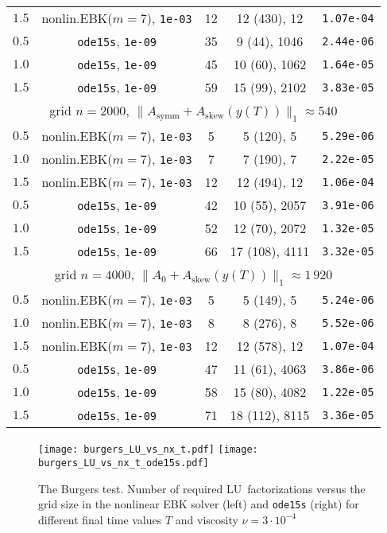 \documentclass[sn-aps]{sn-jnl}
\theoremstyle{thmstyleone}%
\theoremstyle{thmstyletwo}%
\theoremstyle{thmstylethree}%
\newcommand{\Asymm}{A_{\mathrm{symm}}}
\newcommand{\Askew}{A_{\mathrm{skew}}}
\begin{document}
\begin{table}
\begin{tabular}{ccccc}
$1.5$  & nonlin.EBK($m=7$), {\tt 1e-03} & 12    & 12 (430), 12       & {\tt 1.07e-04} \\
$0.5$  & {\tt ode15s},  {\tt 1e-09}     & 35    & 9  (44), 1046      & {\tt 2.44e-06} \\
$1.0$  & {\tt ode15s},  {\tt 1e-09}     & 45    & 10 (60), 1062      & {\tt 1.64e-05} \\
$1.5$  & {\tt ode15s},  {\tt 1e-09}     & 59    & 15 (99), 2102      & {\tt 3.83e-05} \\
\hline
\multicolumn{5}{c}{grid $n=2000$, $\|\Asymm + \Askew (y(T))\|_1\approx 540$}\\
$0.5$  & nonlin.EBK($m=7$), {\tt 1e-03} & 5     & 5 (120), 5         & {\tt 5.29e-06} \\
$1.0$  & nonlin.EBK($m=7$), {\tt 1e-03} & 7     & 7 (190), 7         & {\tt 2.22e-05} \\
$1.5$  & nonlin.EBK($m=7$), {\tt 1e-03} & 12    & 12 (494), 12       & {\tt 1.06e-04} \\
$0.5$  & {\tt ode15s},  {\tt 1e-09}     & 42    & 10 (55), 2057      & {\tt 3.91e-06} \\
$1.0$  & {\tt ode15s},  {\tt 1e-09}     & 52    & 12 (70), 2072      & {\tt 1.32e-05} \\
$1.5$  & {\tt ode15s},  {\tt 1e-09}     & 66    & 17 (108), 4111     & {\tt 3.32e-05} \\
\hline
\multicolumn{5}{c}{grid $n=4000$, $\|A_0 + \Askew (y(T))\|_1\approx 1\,920$}\\
$0.5$  & nonlin.EBK($m=7$), {\tt 1e-03} & 5    & 5 (149), 5         & {\tt 5.24e-06} \\
$1.0$  & nonlin.EBK($m=7$), {\tt 1e-03} & 8    & 8 (276), 8         & {\tt 5.52e-06} \\
$1.5$  & nonlin.EBK($m=7$), {\tt 1e-03} & 12   & 12 (578), 12       & {\tt 1.07e-04} \\
$0.5$  & {\tt ode15s},  {\tt 1e-09}     & 47   & 11 (61), 4063      & {\tt 3.86e-06} \\
$1.0$  & {\tt ode15s},  {\tt 1e-09}     & 58   & 15 (80), 4082      & {\tt 1.22e-05} \\
$1.5$  & {\tt ode15s},  {\tt 1e-09}     & 71   & 18 (112), 8115     & {\tt 3.36e-05} \\
\hline 
\end{tabular}
\end{table}

\begin{figure}
\texttt{[image: burgers\_LU\_vs\_nx\_t.pdf]}%
\texttt{[image: burgers\_LU\_vs\_nx\_t\_ode15s.pdf]}  
\caption{The Burgers test.
Number of required LU~factorizations versus the grid size 
in the nonlinear EBK solver (left) and \texttt{ode15s} (right) for
different final time values $T$ and viscosity $\nu=3\cdot 10^{-4}$}
\label{f:LUs}  
\end{figure}
\end{document}
